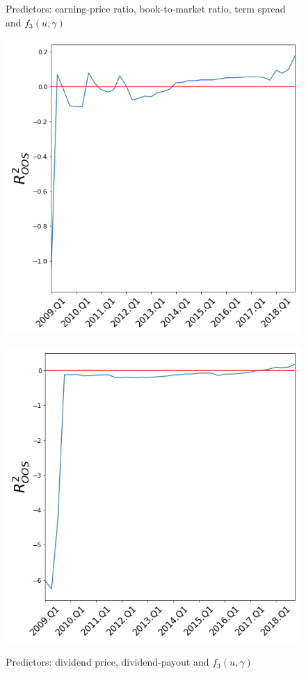 \documentclass[a4paper,12pt,times,numbered,print,index]{report}
\numberwithin{equation}{section}
\begin{document}
	
	\begin{figure}[!htb]
		\begin{minipage}{0.48\textwidth}
			\centering
			\captionsetup{justification=centering,margin=0cm}
			\caption{Predictors: earning-price ratio, book-to-market ratio, term spread and $f_{3}( u,\gamma)$ }
			\includegraphics[width=0.9\linewidth]{CV.png}
			
			\label{CV vs SM}%
		\end{minipage}\hfill
		\begin{minipage}{0.48\textwidth}
			\centering
			\captionsetup{justification=centering,margin=0cm}
			\caption{Predictors: dividend price, dividend-payout and $f_{3}( u,\gamma )$ }
			\includegraphics[width=0.9\linewidth]{L.png}
			
			\label{L vs SM}%
		\end{minipage}
	\end{figure}
	
\end{document}
